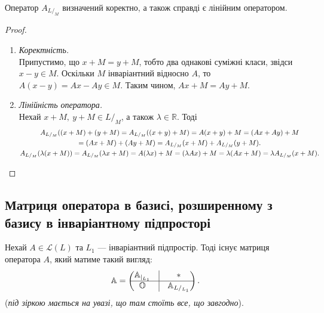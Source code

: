 \documentclass{math_library}
\begin{document}
\begin{proposition}
Оператор $A_{L/_M}$ визначений коректно, а також справді є лінійним оператором.
\end{proposition}

\begin{proof}
\begin{enumerate}[wide=0pt, topsep=0pt,label={\Roman*.}]
\item \textit{Коректність.}\\
Припустимо, що $x+M = y+M$, тобто два однакові суміжні класи, звідси $x-y \in M$. Оскільки $M$ інваріантний відносно $A$, то $A(x-y) = Ax - Ay \in M$. Таким чином, $Ax + M = Ay + M$.

\item \textit{Лінійність оператора.}\\
Нехай $x+M,\ y+M \in L/_M$, а також $\lambda \in \mathbb{R}$. Тоді
\begin{gather*}
A_{L/_M}((x+M) + (y+M) = A_{L/_M}((x+y) + M) = A(x+y) + M = (Ax + Ay) + M \\
= (Ax + M) + (Ay + M) = A_{L/_M}(x+M) + A_{L/_M}(y+M). \\
A_{L/_M}(\lambda(x+M)) = A_{L/_M}( \lambda x + M) = A(\lambda x) + M = (\lambda Ax) + M = \lambda (Ax + M) = \lambda A_{L/_M}(x+M). \qedhere
\end{gather*}
\end{enumerate}
\end{proof}

\subsection{Матриця оператора в базисі, розширенному з базису в інваріантному підпросторі}
\begin{proposition}
Нехай $A \in \mathcal{L}(L)$ та $L_1$ --- інваріантний підпростір. Тоді існує матриця оператора $A$, який матиме такий вигляд:
\begin{align*}
\mathbb{A} = \begin{pmatrix}
 \mathbb{A}_{|_{L_1}}  & \vline & * \\
 \hline
 \mathbb{O} & \vline & \mathbb{A}_{L/_{L_1}}
\end{pmatrix}.
\end{align*}
(\textit{під зіркою мається на увазі, що там стоїть все, що завгодно}).
\end{proposition}
\end{document}
